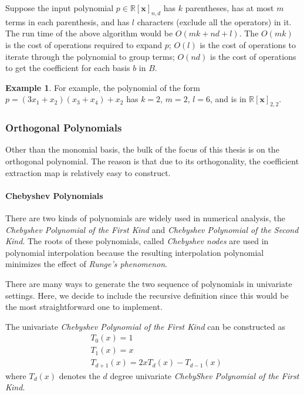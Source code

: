 \documentclass[12pt]{amsart}
\numberwithin{equation}{section}
\theoremstyle{definition}
\newtheorem{example}[thm]{Example}
\numberwithin{thm}{section}
\begin{document}
Suppose the input polynomial $p \in \mathbb{R}[\mathbf{x}]_{n, d}$ has $k$ parentheses, has at most $m$ terms in each parenthesis,
and has $l$ characters (exclude all the operators) in it. 
The run time of the above algorithm would be $O(mk + nd + l)$.
The $O(mk)$ is the cost of operations required to expand $p$;
$O(l)$ is the cost of operations to iterate through the polynomial to group terms;
$O(nd)$ is the cost of operations to get the coefficient for each basis $b$ in $B$.

\begin{example}
     For example, the polynomial of the form $p = (3x_1 + x_2) (x_3 + x_4) + x_2$ has $k = 2$, $m = 2$, $l = 6$, and is in $\mathbb{R}[\mathbf{x}]_{2, 2}$.
\end{example}

\subsubsection{Orthogonal Polynomials}
Other than the monomial basis, the bulk of the focus of this thesis is on the orthogonal polynomial.
The reason is that due to its orthogonality, the coefficient extraction map is relatively easy to construct. 

\smallskip

\paragraph{Chebyshev Polynomials}


There are two kinds of polynomials are widely used in numerical analysis,
the \emph{Chebyshev Polynomial of the First Kind} and \emph{Chebyshev Polynomial of the Second Kind}.
The roots of these polynomials, called \emph{Chebyshev nodes} 
are used in polynomial interpolation because 
the resulting interpolation polynomial minimizes the effect of \emph{Runge's phenomenon}.\cite{Mathews2004Numerical}

There are many ways to generate the two sequence of polynomials in univariate settings. 
Here, we decide to include the recursive definition since this would be the most straightforward one to implement.

The univariate \emph{Chebyshev Polynomial of the First Kind} can be constructed as
\begin{align*} 
     &T_0(x) = 1 \\ 
     &T_1(x) = x \\
     &T_{d+1}(x) = 2x T_d(x) - T_{d-1}(x)
\end{align*}
where $T_d(x)$ denotes the $d$ degree univariate \emph{ChebyShev Polynomial of the First Kind}.
\end{document}
